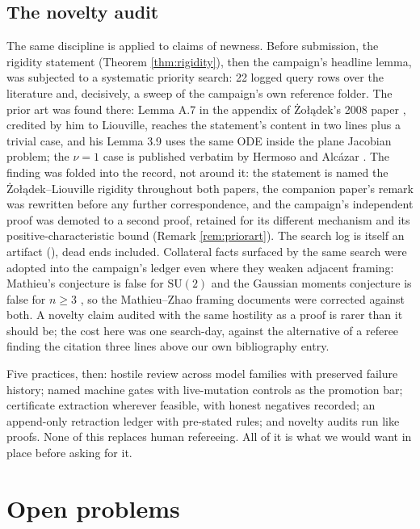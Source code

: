 \documentclass[11pt]{article}
\theoremstyle{definition}
\theoremstyle{remark}
\begin{document}
\subsection{The novelty audit}\label{sec:novelty}

The same discipline is applied to claims of newness. Before submission, the rigidity statement (Theorem \ref{thm:rigidity}), then the campaign's headline lemma, was subjected to a systematic priority search: 22 logged query rows over the literature and, decisively, a sweep of the campaign's own reference folder. The prior art was found there: Lemma A.7 in the appendix of \.Zo{\l}\k{a}dek's 2008 paper \cite{Zoladek}, credited by him to Liouville, reaches the statement's content in two lines plus a trivial case, and his Lemma 3.9 uses the same ODE inside the plane Jacobian problem; the $\nu=1$ case is published verbatim by Hermoso and Alc\'azar \cite{HA}. The finding was folded into the record, not around it: the statement is named the \.Zo{\l}\k{a}dek--Liouville rigidity throughout both papers, the companion paper's remark was rewritten before any further correspondence, and the campaign's independent proof was demoted to a second proof, retained for its different mechanism and its positive-characteristic bound (Remark \ref{rem:priorart}). The search log is itself an artifact (), dead ends included. Collateral facts surfaced by the same search were adopted into the campaign's ledger even where they weaken adjacent framing: Mathieu's conjecture is false for $\mathrm{SU}(2)$ and the Gaussian moments conjecture is false for $n\geq3$ \cite{Long1,Long2}, so the Mathieu--Zhao framing documents were corrected against both. A novelty claim audited with the same hostility as a proof is rarer than it should be; the cost here was one search-day, against the alternative of a referee finding the citation three lines above our own bibliography entry.

\medskip
Five practices, then: hostile review across model families with preserved failure history; named machine gates with live-mutation controls as the promotion bar; certificate extraction wherever feasible, with honest negatives recorded; an append-only retraction ledger with pre-stated rules; and novelty audits run like proofs. None of this replaces human refereeing. All of it is what we would want in place before asking for it.

\section{Open problems}\label{sec:open}
\end{document}
